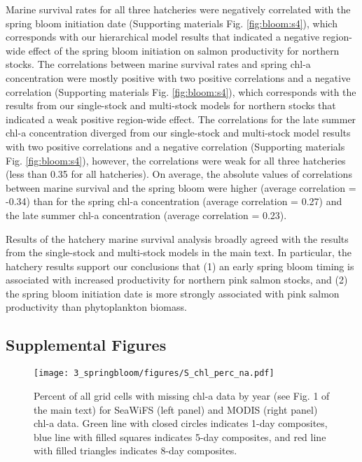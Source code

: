 Marine survival rates for all three hatcheries were negatively correlated with
the spring bloom initiation date (Supporting materials Fig.
\ref{fig:bloom:s4}), which corresponds with our hierarchical model results that
indicated a negative region-wide effect of the spring bloom initiation on salmon
productivity for northern stocks. The correlations between marine survival rates
and spring chl-a concentration were mostly positive with two positive
correlations and a negative correlation (Supporting materials Fig.
\ref{fig:bloom:s4}), which corresponds with the results from our single-stock
and multi-stock models for northern stocks that indicated a weak positive
region-wide effect. The correlations for the late summer chl-a concentration
diverged from our single-stock and multi-stock model results with two positive
correlations and a negative correlation (Supporting materials Fig.
\ref{fig:bloom:s4}), however, the correlations were weak for all three
hatcheries (less than 0.35 for all hatcheries). On average, the absolute values
of correlations between marine survival and the spring bloom were higher
(average correlation = -0.34) than for the spring chl-a concentration (average
correlation = 0.27) and the late summer chl-a concentration (average correlation
= 0.23).

Results of the hatchery marine survival analysis broadly agreed with the
results from the single-stock and multi-stock models in the main text.
In particular, the hatchery results support our conclusions that (1) an
early spring bloom timing is associated with increased productivity for
northern pink salmon stocks, and (2) the spring bloom initiation date is
more strongly associated with pink salmon productivity than
phytoplankton biomass.

\subsection{Supplemental Figures}

\begin{figure}[htbp]
  \centering \texttt{[image: 3\_springbloom/figures/S\_chl\_perc\_na.pdf]}
  \caption{Percent of all grid cells with missing chl-a data by year (see Fig. 1
    of the main text) for SeaWiFS (left panel) and MODIS (right panel) chl-a
    data. Green line with closed circles indicates 1-day composites, blue line
    with filled squares indicates 5-day composites, and red line with filled
    triangles indicates 8-day composites.}
  \label{fig:bloom:s1}
\end{figure}



